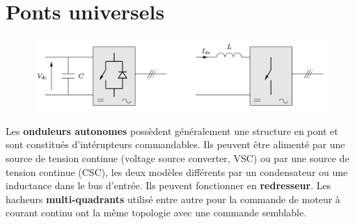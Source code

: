 
\setcounter{chapter}{3}
\chapter{Ponts universels}
	\begin{figure}
	\vspace{-5mm}
	\includegraphics[scale=0.2]{ch4/1}
	\end{figure}
	Les \textbf{onduleurs autonomes} possèdent généralement une structure en pont et sont constitués d'intérupteurs commandables. Ils peuvent être alimenté par une source de tension continue (voltage source converter, VSC) ou par une source de tension continue (CSC), les deux modèles différents par un condensateur ou une inductance dans le bus d'entrée. Ils peuvent fonctionner en \textbf{redresseur}. Les hacheurs \textbf{multi-quadrants} utilisé entre autre pour la commande de moteur à courant continu ont la même topologie avec une commande semblable. 
	
